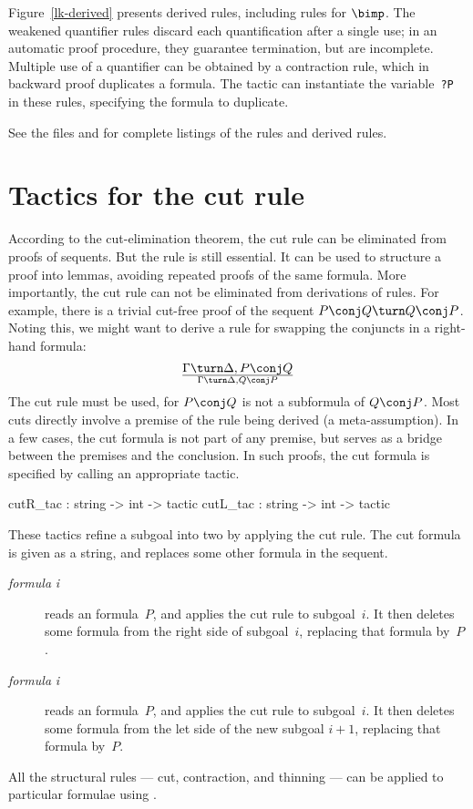 Figure~\ref{lk-derived} presents derived rules, including rules for
$\bimp$.  The weakened quantifier rules discard each quantification after a
single use; in an automatic proof procedure, they guarantee termination,
but are incomplete.  Multiple use of a quantifier can be obtained by a
contraction rule, which in backward proof duplicates a formula.  The tactic
 can instantiate the variable~{\tt?P} in these rules,
specifying the formula to duplicate.

See the files  and 
for complete listings of the rules and derived rules.


\section{Tactics for the cut rule}
According to the cut-elimination theorem, the cut rule can be eliminated
from proofs of sequents.  But the rule is still essential.  It can be used
to structure a proof into lemmas, avoiding repeated proofs of the same
formula.  More importantly, the cut rule can not be eliminated from
derivations of rules.  For example, there is a trivial cut-free proof of
the sequent \(P\conj Q\turn Q\conj P\).
Noting this, we might want to derive a rule for swapping the conjuncts
in a right-hand formula:
\[ \Gamma\turn \Delta, P\conj Q\over \Gamma\turn \Delta, Q\conj P \]
The cut rule must be used, for $P\conj Q$ is not a subformula of $Q\conj
P$.  Most cuts directly involve a premise of the rule being derived (a
meta-assumption).  In a few cases, the cut formula is not part of any
premise, but serves as a bridge between the premises and the conclusion.
In such proofs, the cut formula is specified by calling an appropriate
tactic.

\begin{ttbox} 
cutR_tac : string -> int -> tactic
cutL_tac : string -> int -> tactic
\end{ttbox}
These tactics refine a subgoal into two by applying the cut rule.  The cut
formula is given as a string, and replaces some other formula in the sequent.
\begin{description}
\item[ {\it formula} {\it i}] 
reads an \LK{} formula~$P$, and applies the cut rule to subgoal~$i$.  It
then deletes some formula from the right side of subgoal~$i$, replacing
that formula by~$P$.

\item[ {\it formula} {\it i}] 
reads an \LK{} formula~$P$, and applies the cut rule to subgoal~$i$.  It
then deletes some formula from the let side of the new subgoal $i+1$,
replacing that formula by~$P$.
\end{description}
All the structural rules --- cut, contraction, and thinning --- can be
applied to particular formulae using .


